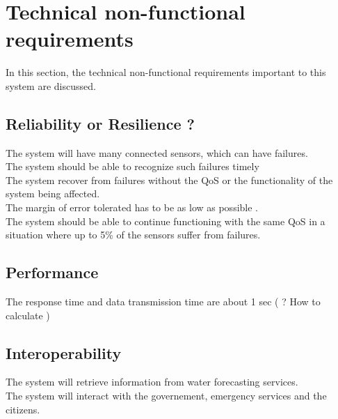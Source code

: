 \section{Technical non-functional requirements}
In this section, the technical non-functional requirements important to this system are discussed.

\subsection{Reliability or Resilience ? }

The system will have many connected sensors, which can have failures. \\
The system should be able to recognize such failures timely \\
The system recover from failures without the QoS or the functionality of the system being affected. \\
The margin of error tolerated has to be as low as possible .\\
The system should be able to continue functioning with the same QoS in a situation where up to 5\% of the sensors suffer from failures. \\ %

\subsection{Performance}
The response time and data transmission time are about 1 sec ( ? How to calculate ) \\

\subsection{Interoperability}
The system will retrieve information from water forecasting services.\\ 
The system will interact with the governement, emergency services and the citizens.\\


